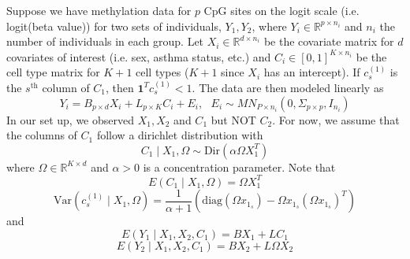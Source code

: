 \documentclass{article}
\begin{document}
Suppose we have methylation data for $p$ CpG sites on the logit scale (i.e. logit(beta value)) for two sets of individuals, $Y_1, Y_2$, where $Y_i \in \mathbb{R}^{p \times n_i}$ and $n_i$ the number of individuals in each group. Let $X_i \in \mathbb{R}^{d \times n_i}$ be the covariate matrix for $d$ covariates of interest (i.e. sex, asthma status, etc.) and $C_i \in [0,1]^{K \times n_i}$ be the cell type matrix for $K+1$ cell types ($K+1$ since $X_i$ has an intercept). If $c_s^{(1)}$ is the $s^{\text{th}}$ column of $C_1$, then $\bm{1}^T c_s^{(1)} < 1$. The data are then modeled linearly as
\[
Y_i = B_{p \times d} X_i + L_{p \times K} C_i + E_i, \text{ } E_i \sim MN_{P \times n_i}\left( 0, \Sigma_{p \times p}, I_{n_i} \right)
\]
In our set up, we observed $X_1, X_2$ and $C_1$ but NOT $C_2$. For now, we assume that the columns of $C_1$ follow a dirichlet distribution with
\[
C_1 \mid X_1, \Omega \sim \text{Dir}\left( \alpha \Omega X_1^T \right)
\]
where $\Omega \in \mathbb{R}^{K \times d}$ and $\alpha > 0$ is a concentration parameter. Note that
\[
E\left( C_1 \mid X_1, \Omega \right) = \Omega X_1^T
\]
\[
\text{Var}\left( c_s^{(1)} \mid X_1, \Omega \right) = \frac{1}{\alpha + 1}\left( \text{diag}\left( \Omega x_{1_s} \right) - \Omega x_{1_s} \left( \Omega x_{1_s} \right)^T \right)
\]
and
\[
E\left( Y_1 \mid X_1, X_2, C_1 \right) = BX_1 + LC_1
\]
\[
E\left(  Y_2 \mid X_1, X_2, C_1 \right) = BX_2 + L\Omega X_2
\]
\end{document}
